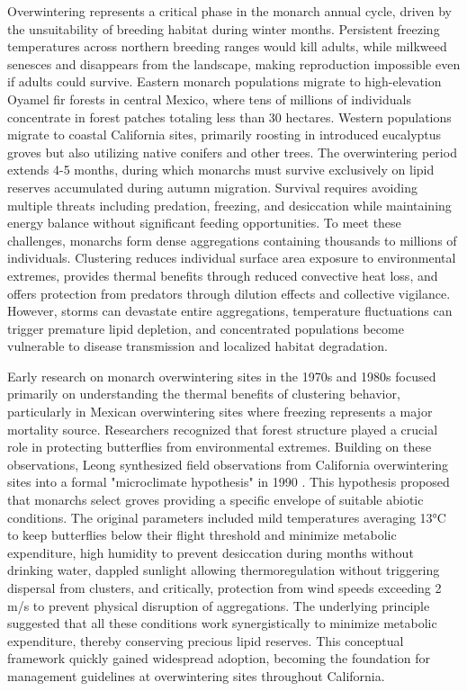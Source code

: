 Overwintering represents a critical phase in the monarch annual cycle, driven by the unsuitability of breeding habitat during winter months. Persistent freezing temperatures across northern breeding ranges would kill adults, while milkweed senesces and disappears from the landscape, making reproduction impossible even if adults could survive. Eastern monarch populations migrate to high-elevation Oyamel fir forests in central Mexico, where tens of millions of individuals concentrate in forest patches totaling less than 30 hectares. Western populations migrate to coastal California sites, primarily roosting in introduced eucalyptus groves but also utilizing native conifers and other trees. The overwintering period extends 4-5 months, during which monarchs must survive exclusively on lipid reserves accumulated during autumn migration. Survival requires avoiding multiple threats including predation, freezing, and desiccation while maintaining energy balance without significant feeding opportunities. To meet these challenges, monarchs form dense aggregations containing thousands to millions of individuals. Clustering reduces individual surface area exposure to environmental extremes, provides thermal benefits through reduced convective heat loss, and offers protection from predators through dilution effects and collective vigilance. However, storms can devastate entire aggregations, temperature fluctuations can trigger premature lipid depletion, and concentrated populations become vulnerable to disease transmission and localized habitat degradation.

Early research on monarch overwintering sites in the 1970s and 1980s focused primarily on understanding the thermal benefits of clustering behavior, particularly in Mexican overwintering sites where freezing represents a major mortality source. Researchers recognized that forest structure played a crucial role in protecting butterflies from environmental extremes. Building on these observations, Leong synthesized field observations from California overwintering sites into a formal "microclimate hypothesis" in 1990 \citep{leongMicroenvironmentalFactorsAssociated1990a}. This hypothesis proposed that monarchs select groves providing a specific envelope of suitable abiotic conditions. The original parameters included mild temperatures averaging 13°C to keep butterflies below their flight threshold and minimize metabolic expenditure, high humidity to prevent desiccation during months without drinking water, dappled sunlight allowing thermoregulation without triggering dispersal from clusters, and critically, protection from wind speeds exceeding 2 m/s to prevent physical disruption of aggregations. The underlying principle suggested that all these conditions work synergistically to minimize metabolic expenditure, thereby conserving precious lipid reserves. This conceptual framework quickly gained widespread adoption, becoming the foundation for management guidelines at overwintering sites throughout California.

